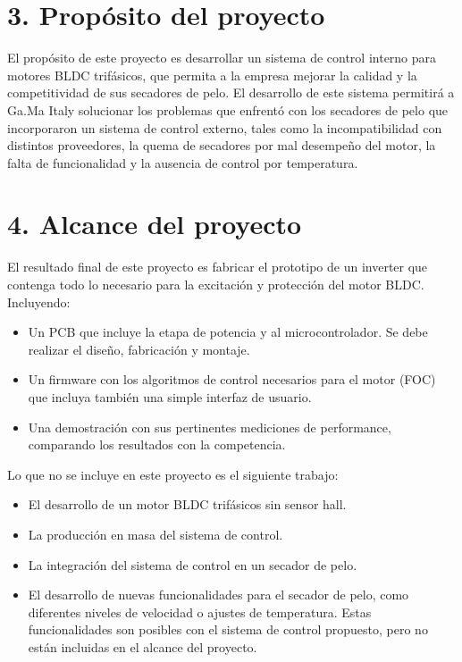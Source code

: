 \documentclass[
11pt, %
codirector, %
]{charter}
\begin{document}
\section{3. Propósito del proyecto}
\label{sec:proposito}

El propósito de este proyecto es desarrollar un sistema de control interno para motores BLDC trifásicos, que permita a la empresa mejorar la calidad y la competitividad de sus secadores de pelo. El desarrollo de este sistema permitirá a Ga.Ma Italy solucionar los problemas que enfrentó con los secadores de pelo que incorporaron un sistema de control externo, tales como la incompatibilidad con distintos proveedores, la quema de secadores por mal desempeño del motor, la falta de funcionalidad y la ausencia de control por temperatura.

\section{4. Alcance del proyecto}
\label{sec:alcance}

El resultado final de este proyecto es fabricar el prototipo de un inverter que contenga todo lo necesario
para la excitación y protección del motor BLDC. Incluyendo:

\begin{itemize}
	\item Un PCB que incluye la etapa de potencia y al microcontrolador. Se debe realizar el diseño, fabricación y montaje.
	\item Un firmware con los algoritmos de control necesarios para el motor (FOC) que incluya también una simple interfaz de usuario.
	\item Una demostración con sus pertinentes mediciones de performance, comparando los resultados con la competencia.
\end{itemize}

Lo que no se incluye en este proyecto es el siguiente trabajo:

\begin{itemize}
	\item El desarrollo de un motor BLDC trifásicos sin sensor hall.
	\item La producción en masa del sistema de control.
	\item La integración del sistema de control en un secador de pelo.
	\item El desarrollo de nuevas funcionalidades para el secador de pelo, como diferentes niveles de velocidad o ajustes de temperatura. Estas funcionalidades son posibles con el sistema de control propuesto, pero no están incluidas en el alcance del proyecto.
\end{itemize}
\end{document}
